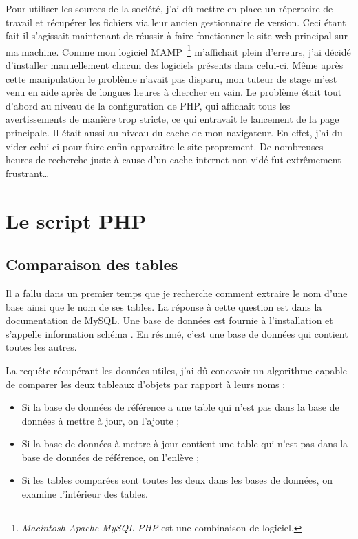 Pour utiliser les sources de la société, j'ai dû mettre en place un
répertoire de travail et récupérer les fichiers via leur ancien
gestionnaire de version. Ceci étant fait il s'agissait maintenant de
réussir à faire fonctionner le site web principal sur ma machine. Comme
mon logiciel MAMP\, \footnote{\emph{Macintosh Apache MySQL PHP} est une
combinaison de logiciel.} m'affichait plein d'erreurs, j'ai décidé
d'installer manuellement chacun des logiciels présents dans celui-ci.
Même après cette manipulation le problème n'avait pas disparu, mon
tuteur de stage m'est venu en aide après de longues heures à chercher en
vain. Le problème était tout d'abord au niveau de la configuration de
PHP, qui affichait tous les avertissements de manière trop stricte, ce
qui entravait le lancement de la page principale. Il était aussi au
niveau du cache de mon navigateur. En effet, j'ai du vider celui-ci pour
faire enfin apparaitre le site proprement. De nombreuses heures de
recherche juste à cause d'un cache internet non vidé fut extrêmement
frustrant\dots

\section{Le script PHP} %
\label{sec:Le script PHP}

\subsection{Comparaison des tables} %
\label{sub:Comparaison des tables}

Il a fallu dans un premier temps que je recherche comment extraire le
nom d'une base ainsi que le nom de ses tables. La réponse à cette
question est dans la documentation de MySQL. Une base de données est
fournie à l'installation et s'appelle \og information schéma \fg{} . En
résumé, c'est une base de données qui contient toutes les autres.

La requête récupérant les données utiles, j'ai dû concevoir un
algorithme capable de comparer les deux tableaux d'objets par rapport à
leurs noms :

\begin{itemize}
    \item Si la base de données de référence a une table qui n'est pas
    dans la base de données à mettre à jour, on l'ajoute ;
    \item Si la base de données à mettre à jour contient une table qui
    n'est pas dans la base de données de référence, on l'enlève ;
    \item Si les tables comparées sont toutes les deux dans les bases de
    données, on examine l'intérieur des tables.
\end{itemize}


